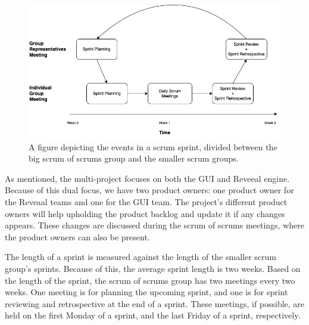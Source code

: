 \begin{figure}[H]
    \centering
    \includegraphics[width=\textwidth]{common/figures/Scrum_of_scrums_schedule.png}
    \caption{A figure depicting the events in a scrum sprint, divided between the big scrum of scrums group and the smaller scrum groups.}
    \label{fig:scrum-of-scrums-events}
\end{figure}


As mentioned, the multi-project focuses on both the GUI and Reveeal engine.
Because of this dual focus, we have two product owners: one product owner for the Reveaal teams and one for the GUI team.
The project's different product owners will help upholding the product backlog and update it if any changes appears. 
These changes are discussed during the scrum of scrums meetings, where the product owners can also be present.

The length of a sprint is measured against the length of the smaller scrum group's sprints.
Because of this, the average sprint length is two weeks.
Based on the length of the sprint, the scrum of scrums group has two meetings every two weeks. 
One meeting is for planning the upcoming sprint, and one is for sprint reviewing and retrospective at the end of a sprint.
These meetings, if possible, are held on the first Monday of a sprint, and the last Friday of a sprint, respectively.


